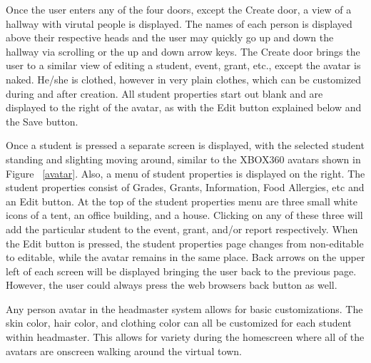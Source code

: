 \documentclass[11pt]{article}
\begin{document}
Once the user enters any of the four doors, except the Create door, a view of a hallway with virutal people is displayed. The names of each person is displayed above their respective heads and the user may quickly go up and down the hallway via scrolling or the up and down arrow keys. The Create door brings the user to a similar view of editing a student, event, grant, etc., except the avatar is naked. He/she is clothed, however in very plain clothes, which can be customized during and after creation. All student properties start out blank and are displayed to the right of the avatar, as with the Edit button explained below and the Save button.

Once a student is pressed a separate screen is displayed, with the selected student standing and slighting moving around, similar to the XBOX360 avatars shown in Figure ~\ref{avatar}. Also, a menu of student properties is displayed on the right. The student properties consist of Grades, Grants, Information, Food Allergies, etc and an Edit button. At the top of the student properties menu are three small white icons of a tent, an office building, and a house. Clicking on any of these three will add the particular student to the event, grant, and/or report respectively. When the Edit button is pressed, the student properties page changes from non-editable to editable, while the avatar remains in the same place. Back arrows on the upper left of each screen will be displayed bringing the user back to the previous page. However, the user could always press the web browsers back button as well.

Any person avatar in the headmaster system allows for basic customizations. The skin color, hair color, and clothing color can all be customized for each student within headmaster. This allows for variety during the homescreen where all of the avatars are onscreen walking around the virtual town.
\end{document}
